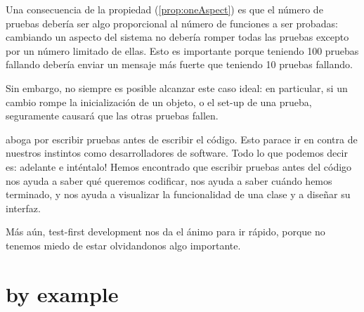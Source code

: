 \documentclass[a4paper,10pt,twoside]{book}
\begin{document}
Una consecuencia de la propiedad (\ref{prop:oneAspect}) es que 
el número de pruebas debería ser algo proporcional al número de funciones
a ser probadas: cambiando un aspecto del sistema no debería romper todas las pruebas
excepto por un número limitado de ellas. Esto es importante porque teniendo 100 pruebas fallando
debería enviar un mensaje más fuerte que teniendo 10 pruebas fallando.
  
Sin embargo, no siempre es posible alcanzar este caso ideal: 
en particular, si un cambio rompe la inicialización de un objeto, o el set-up de una prueba,
seguramente causará que las otras pruebas fallen.

 aboga por escribir pruebas antes de escribir el código.
Esto parace ir en contra de nuestros instintos como desarrolladores de software. 
Todo lo que podemos decir es: adelante e inténtalo!
Hemos encontrado que escribir pruebas antes del código nos ayuda a saber qué queremos codificar,
nos ayuda a saber cuándo hemos terminado, y nos ayuda a visualizar la funcionalidad
de una clase y a dise\~nar su interfaz.

Más aún, test-first development nos da el ánimo para ir rápido, porque no tenemos miedo de estar
olvidandonos algo importante.






\section{\sunit by example}
\end{document}
